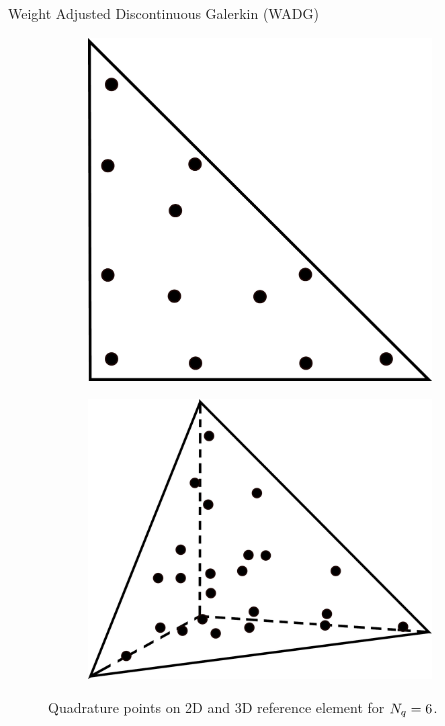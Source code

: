 \begin{frame}{Weight Adjusted Discontinuous Galerkin (WADG)}
  \begin{figure}[!htbp]
    \begin{subfigure}{0.45\textwidth}
      \centering
      \includegraphics[scale=0.07]{image/quad_2d.pdf}
    \end{subfigure}
    \begin{subfigure}{0.45\textwidth}
      \centering
      \includegraphics[scale=0.08]{image/quad_3d.pdf}
    \end{subfigure}
    \caption{\scriptsize{Quadrature points on 2D and 3D reference element for ${N_q}=6$.}}
    \label{quad_point_sketch}
  \end{figure}


\end{frame}


